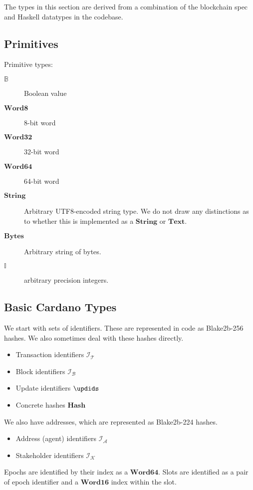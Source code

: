 \documentclass{article}
\newcommand{\idsof}[1]{\mathcal{I}\!_#1}
\newcommand{\txids}{\idsof{\txs}}
\newcommand{\blockids}{\idsof{\blocks}}
\newcommand{\agentids}{\idsof{\agents}}
\newcommand{\stakeholderids}{\idsof{\mathcal{K}}}
\newcommand{\agents}{\mathcal{A}}
\newcommand{\txs}{\mathcal{T}}
\newcommand{\blocks}{\mathcal{B}}
\newcommand{\hstype}[1]{\textbf{#1}}
\newcommand{\String}{\hstype{String}}
\newcommand{\Word}[1]{\hstype{Word#1}}
\newcommand{\hash}{\hstype{Hash}}
\newcommand{\Integer}{\mathbb{I}}
\newcommand{\Bool}{\mathbb{B}}
\newcommand{\Bytes}{\hstype{Bytes}}
\begin{document}
The types in this section are derived from a combination of the blockchain spec
and Haskell datatypes in the codebase.

\subsection{Primitives}

Primitive types:

\begin{description}
\item [$\Bool$] Boolean value
\item [$\Word{8}$] 8-bit word
\item [$\Word{32}$] 32-bit word
\item [$\Word{64}$] 64-bit word
\item [$\String$] Arbitrary UTF8-encoded string type. We do not draw any
  distinctions as to whether this is implemented as a $\hstype{String}$ or
  $\hstype{Text}$.
\item [$\Bytes$] Arbitrary string of bytes.
\item [$\Integer$] arbitrary precision integers.
\end{description}

\subsection{Basic Cardano Types}

We start with sets of identifiers. These are represented in code as Blake2b-256
hashes. We also sometimes deal with these hashes directly.

\begin{itemize}
\item{Transaction identifiers $\txids$}
\item{Block identifiers $\blockids$}
\item Update identifiers $\updids$
\item Concrete hashes $\hash$
\end{itemize}

We also have addresses, which are represented as Blake2b-224 hashes.

\begin{itemize}
\item{Address (agent) identifiers $\agentids$}
\item Stakeholder identifiers $\stakeholderids$
\end{itemize}

Epochs are identified by their index as a $\Word{64}$. Slots are identified as a
pair of epoch identifier and a $\Word{16}$ index within the slot.
\end{document}
